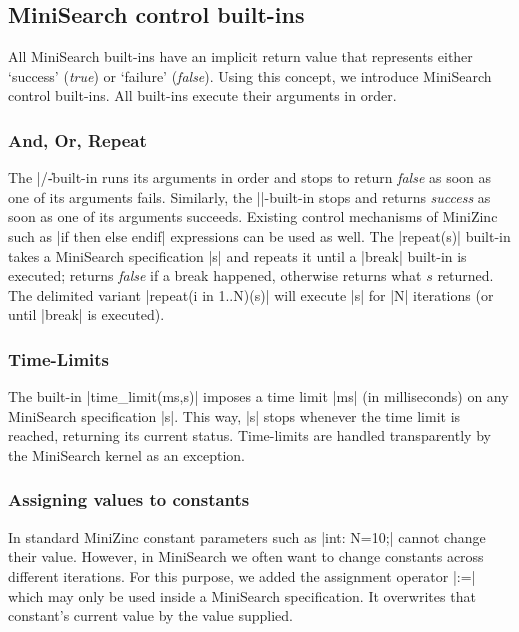 \documentclass[a4paper,13pt,onecolumn]{article}%
\newcommand{\MiniZinc}{\mbox{\sc MiniZinc}\xspace}
\newcommand{\MiniSearch}{\mbox{\sc MiniSearch}\xspace}
\begin{document}
\subsection{\MiniSearch control built-ins}\label{sec:control}

All \MiniSearch built-ins have an implicit return value that represents either `success' ({\em true}) or `failure' ({\em false}).
Using this concept, we introduce \MiniSearch control built-ins.
All built-ins execute their arguments in order.

\subsubsection{And, Or, Repeat}
The \mzninline|/\|-built-in runs its arguments in order 
and stops to return \textit{false} as soon as one of its arguments fails. 
Similarly, the \mzninline|\/|-built-in stops and returns \textit{success} as soon as one of its arguments succeeds.
Existing control mechanisms of \MiniZinc such as \mzninline|if then else endif| expressions can be used as well. 
The \mzninline|repeat(s)| built-in takes a \MiniSearch specification
\mzninline|s| and repeats it until a \mzninline|break| built-in is
executed; returns \emph{false} if a break happened, otherwise returns what $s$ returned.
 The delimited variant \mzninline|repeat(i in 1..N)(s)| will execute \mzninline|s| for \mzninline|N| iterations (or until \mzninline|break| is executed).


\subsubsection{Time-Limits}
The built-in \mzninline|time_limit(ms,s)| imposes a time limit \mzninline|ms| (in milliseconds) on any \MiniSearch specification \mzninline|s|. This way, \mzninline|s| stops whenever the time limit is reached, returning its current status.
Time-limits are handled transparently by the \MiniSearch kernel as an exception.

\subsubsection{Assigning values to constants}
In standard \MiniZinc constant parameters such as \mzninline|int: N=10;| cannot change their value. However, in \MiniSearch we often want to change constants across different iterations. For this purpose, we added the assignment operator \mzninline|:=| which may only be used inside a \MiniSearch specification. It overwrites that constant's current value by the value supplied.
\end{document}
